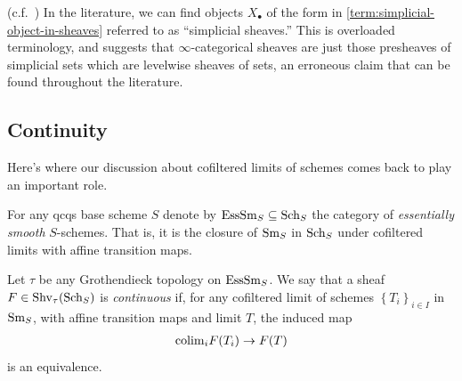 \documentclass[11pt,openany]{book}
\begin{document}
\begin{warning} (c.f.~\cite[7.1.3.1]{HTT}) In the literature, we can find objects $X_\bullet$ of the form in \autoref{term:simplicial-object-in-sheaves} referred to as ``simplicial sheaves.'' This is overloaded terminology, and suggests that $\infty$-categorical sheaves are just those presheaves of simplicial sets which are levelwise sheaves of sets, an erroneous claim that can be found throughout the literature.
\end{warning}

\subsection{Continuity}

Here's where our discussion about cofiltered limits of schemes comes back to play an important role.

\begin{definition} For any qcqs base scheme $S$ denote by $\mathrm{EssSm}_S\subseteq \mathrm{Sch}_S$ the category of \emph{essentially smooth} $S$-schemes. That is, it is the closure of $\mathrm{Sm}_S$ in $\mathrm{Sch}_S$ under cofiltered limits with affine transition maps.
\end{definition}

\begin{definition}\label{def:continuous-sheaf}
Let $\tau$ be any Grothendieck topology on $\mathrm{EssSm}_S$. We say that a sheaf $F\in \mathrm{Shv}_\tau(\mathrm{Sch}_S)$ is \emph{continuous} if, for any cofiltered limit of schemes $\left\{ T_i \right\}_{i\in I}$ in $\mathrm{Sm}_S$, with affine transition maps and limit $T$, the induced map
\begin{align*}
    \mathrm{colim}_i F(T_i)\to F(T)
\end{align*}
is an equivalence.
\end{definition}
\end{document}

